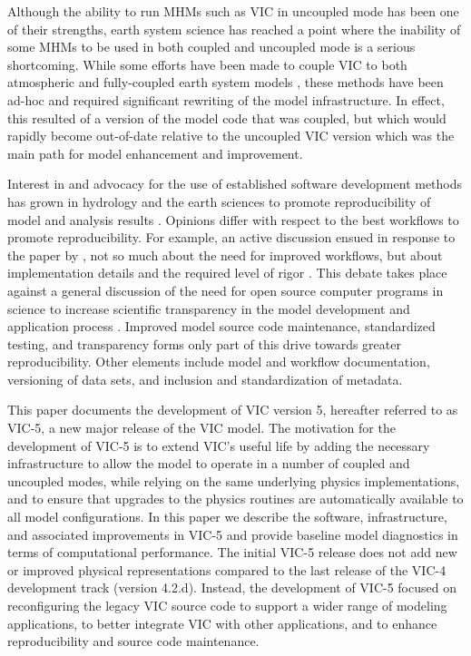\documentclass[gmd, manuscript]{copernicus}
\begin{document}
  Although the ability to run MHMs such as VIC in uncoupled mode has been one of their strengths, earth system science has reached a point where the inability of some MHMs to be used in both coupled and uncoupled mode is a serious shortcoming. While some efforts have been made to couple VIC to both atmospheric and fully-coupled earth system models \citep[e.g.][]{Zhu_2009,Hamman_2016a}, these methods have been ad-hoc and required significant rewriting of the model infrastructure. In effect, this resulted of a version of the model code that was coupled, but which would rapidly become out-of-date relative to the uncoupled VIC version which was the main path for model enhancement and improvement.

  Interest in and advocacy for the use of established software development methods has grown in hydrology and the earth sciences to promote reproducibility of model and analysis results \citep[e.g.][]{Ceola_2015,Fienen_2016,Gil_2016,Hutton_2016}. Opinions differ with respect to the best workflows to promote reproducibility. For example, an active discussion ensued in response to the paper by \citet{Hutton_2016}, not so much about the need for improved workflows, but about implementation details and the required level of rigor \citep{Anel_2017,Melsen_2017,Hut_2017,Hutton_2017a,Hutton_2017b}. This debate takes place against a general discussion of the need for open source computer programs in science to increase scientific transparency in the model development and application process \citep{Ince_2012}. Improved model source code maintenance, standardized testing, and transparency forms only part of this drive towards greater reproducibility. Other elements include model and workflow documentation, versioning of data sets, and inclusion and standardization of metadata.

  This paper documents the development of VIC version 5, hereafter referred to as VIC-5, a new major release of the VIC model. The motivation for the development of VIC-5 is to extend VIC's useful life by adding the necessary infrastructure to allow the model to operate in a number of coupled and uncoupled modes, while relying on the same underlying physics implementations, and to ensure that upgrades to the physics routines are automatically available to all model configurations. In this paper we describe the software, infrastructure, and associated improvements in VIC-5 and provide baseline model diagnostics in terms of computational performance. The initial VIC-5 release does not add new or improved physical representations compared to the last release of the VIC-4 development track (version 4.2.d). Instead, the development of VIC-5 focused on reconfiguring the legacy VIC source code to support a wider range of modeling applications, to better integrate VIC with other applications, and to enhance reproducibility and source code maintenance.
\end{document}
